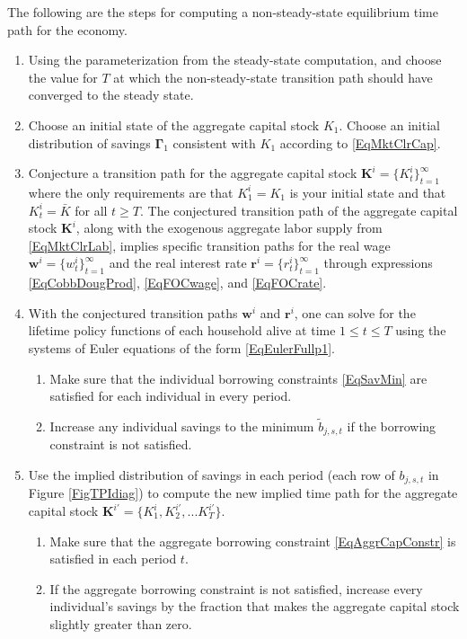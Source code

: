 \documentclass[letterpaper,12pt]{article}
\theoremstyle{definition}
\begin{document}
  The following are the steps for computing a non-steady-state equilibrium time path for the economy.
  \begin{enumerate}
    \item Using the parameterization from the steady-state computation, and choose the value for $T$ at which the non-steady-state transition path should have converged to the steady state.
    \item Choose an initial state of the aggregate capital stock $K_1$. Choose an initial distribution of savings $\bm{\Gamma}_1$ consistent with $K_1$ according to \eqref{EqMktClrCap}.
    \item Conjecture a transition path for the aggregate capital stock $\bm{K}^i=\{K^i_t\}_{t=1}^\infty$ where the only requirements are that $K^i_1=K_1$ is your initial state and that $K^i_t=\bar{K}$ for all $t\geq T$. The conjectured transition path of the aggregate capital stock $\bm{K}^i$, along with the exogenous aggregate labor supply from \eqref{EqMktClrLab}, implies specific transition paths for the real wage $\bm{w}^i=\{w^i_t\}_{t=1}^\infty$ and the real interest rate $\bm{r}^i=\{r^i_t\}_{t=1}^\infty$ through expressions \eqref{EqCobbDougProd}, \eqref{EqFOCwage}, and \eqref{EqFOCrate}.
    \item With the conjectured transition paths $\bm{w}^i$ and $\bm{r}^i$, one can solve for the lifetime policy functions of each household alive at time $1\leq t\leq T$ using the systems of Euler equations of the form \eqref{EqEulerFullp1}.
      \begin{enumerate}
        \item Make sure that the individual borrowing constraints \eqref{EqSavMin} are satisfied for each individual in every period.
        \item Increase any individual savings to the minimum $\tilde{b}_{j,s,t}$ if the borrowing constraint is not satisfied.
      \end{enumerate}
    \item Use the implied distribution of savings in each period (each row of $b_{j,s,t}$ in Figure \ref{FigTPIdiag}) to compute the new implied time path for the aggregate capital stock $\bm{K}^{i'} = \{K_1^i,K_2^{i'},...K_T^{i'}\}$.
      \begin{enumerate}
        \item Make sure that the aggregate borrowing constraint \eqref{EqAggrCapConstr} is satisfied in each period $t$.
        \item If the aggregate borrowing constraint is not satisfied, increase every individual's savings by the fraction that makes the aggregate capital stock slightly greater than zero.

\end{enumerate}
\end{enumerate}
\end{document}
